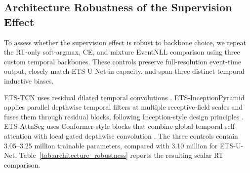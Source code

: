 \documentclass[12pt]{article}
\begin{document}
\subsection{Architecture Robustness of the Supervision Effect}
\label{sec:architecture_robustness}

To assess whether the supervision effect is robust to backbone choice, we
repeat the RT-only soft-argmax, CE, and mixture EventNLL comparison using three
custom temporal backbones. These controls preserve full-resolution event-time
output, closely match ETS-U-Net in capacity, and span three distinct temporal
inductive biases.

ETS-TCN uses residual dilated temporal convolutions
\citep{bai2018tcn,yu2016dilated}. ETS-InceptionPyramid applies parallel
depthwise temporal filters at multiple receptive-field scales and fuses them
through residual blocks, following Inception-style design principles
\citep{szegedy2015going,santamaria2020eeginception}. ETS-AttnSeg uses
Conformer-style blocks that combine global temporal self-attention with local
gated depthwise convolution
\citep{vaswani2017attention,gulati2020conformer}. The three controls contain
3.05--3.25 million trainable parameters, compared with 3.10 million for
ETS-U-Net. Table~\ref{tab:architecture_robustness} reports the resulting scalar RT
comparison.
\end{document}
